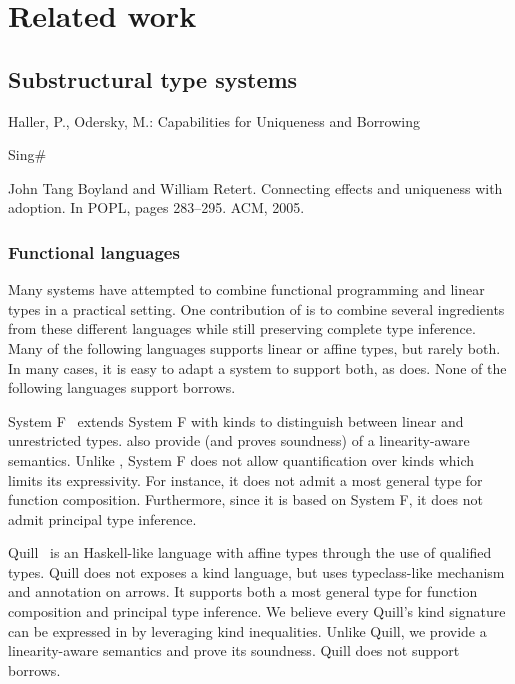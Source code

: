 \section{Related work}

\subsection{Substructural type systems}

Haller, P., Odersky, M.: Capabilities for Uniqueness and Borrowing
\cite{DBLP:conf/ecoop/HallerO10}

Sing\#

John Tang Boyland and William Retert. Connecting effects and
uniqueness with adoption. In POPL, pages 283–295. ACM, 2005.
\cite{DBLP:conf/popl/BoylandR05}


\subsubsection{Functional languages}

Many systems have attempted to combine
functional programming and linear types in a practical setting.
One contribution of \lang is to combine several ingredients
from these different languages while still preserving
complete type inference.
Many of the following languages supports linear or affine types, but rarely
both. In many cases, it is easy to adapt a system to support both, as
\lang does.
None of the following languages support borrows.

System F\degree~\citep{DBLP:conf/tldi/MazurakZZ10}
extends System F with kinds to distinguish
between linear and unrestricted types.
\citet{DBLP:conf/tldi/MazurakZZ10} also provide
(and proves soundness) of a linearity-aware semantics.
Unlike \lang, System F\degree{} does not allow
quantification over kinds which limits its expressivity. For instance, it
does not admit a most general type for function composition.
Furthermore, since it is based on System F, it does not admit
principal type inference.

Quill~\citep{DBLP:conf/icfp/Morris16} is an Haskell-like language with affine
types through the use of qualified types.
Quill does not exposes a kind language, but
uses typeclass-like mechanism and annotation on arrows.
It supports both a most general type for function composition and
principal type inference.
We believe every Quill's kind signature can be expressed in \lang by leveraging
kind inequalities.
Unlike Quill,
we provide a linearity-aware semantics and prove its soundness.
Quill does not support borrows.

